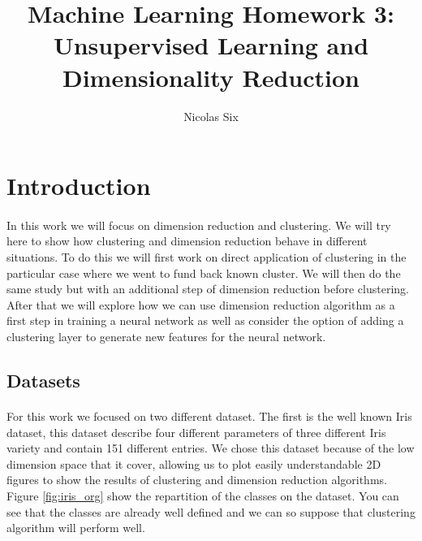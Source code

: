 \documentclass[twocolumn,a4paper,10pt]{article}
\title{Machine Learning Homework 3:\\Unsupervised Learning and Dimensionality Reduction}
\author{Nicolas Six}
\begin{document}
\maketitle \tableofcontents{}


\section{Introduction}

\paragraph{}

In this work we will focus on dimension reduction and clustering.
We will try here to show how clustering and dimension reduction behave
in different situations. To do this we will first work on direct application
of clustering in the particular case where we went to fund back known
cluster. We will then do the same study but with an additional step
of dimension reduction before clustering. After that we will explore
how we can use dimension reduction algorithm as a first step in training
a neural network as well as consider the option of adding a clustering
layer to generate new features for the neural network.

\subsection{Datasets}

\label{intro_dataset} 

\paragraph{}

For this work we focused on two different dataset. The first is the
well known Iris dataset, this dataset describe four different parameters
of three different Iris variety and contain 151 different entries.
We chose this dataset because of the low dimension space that it cover,
allowing us to plot easily understandable 2D figures to show the results
of clustering and dimension reduction algorithms. Figure \ref{fig:iris_org}
show the repartition of the classes on the dataset. You can see that
the classes are already well defined and we can so suppose that clustering
algorithm will perform well.
\end{document}
